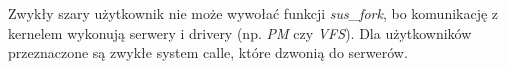 Zwykły szary użytkownik nie może wywołać funkcji \textit{sus\_fork}, bo komunikację z kernelem wykonują serwery i drivery (np. \textit{PM} czy \textit{VFS}). Dla użytkowników przeznaczone są zwykłe system calle, które dzwonią do serwerów.
